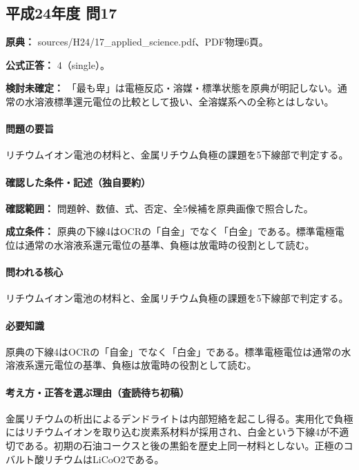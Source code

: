 \subsection{平成24年度 問17}
\label{q:h24-reg-applied-17}

\noindent\textbf{原典：} sources/H24/17\_applied\_science.pdf、PDF物理6頁。

\textbf{公式正答：} 4（single）。

\par\textbf{検討未確定：} 「最も卑」は電極反応・溶媒・標準状態を原典が明記しない。通常の水溶液標準還元電位の比較として扱い、全溶媒系への全称とはしない。

\paragraph{問題の要旨} リチウムイオン電池の材料と、金属リチウム負極の課題を5下線部で判定する。

\paragraph{確認した条件・記述（独自要約）}\mbox{}\par

\noindent\textbf{確認範囲：} 問題幹、数値、式、否定、全5候補を原典画像で照合した。\par

\noindent\textbf{成立条件：} 原典の下線4はOCRの「自金」でなく「白金」である。標準電極電位は通常の水溶液系還元電位の基準、負極は放電時の役割として読む。\par

\paragraph{問われる核心} リチウムイオン電池の材料と、金属リチウム負極の課題を5下線部で判定する。

\paragraph{必要知識} 原典の下線4はOCRの「自金」でなく「白金」である。標準電極電位は通常の水溶液系還元電位の基準、負極は放電時の役割として読む。

\paragraph{考え方・正答を選ぶ理由（査読待ち初稿）} 金属リチウムの析出によるデンドライトは内部短絡を起こし得る。実用化で負極にはリチウムイオンを取り込む炭素系材料が採用され、白金という下線4が不適切である。初期の石油コークスと後の黒鉛を歴史上同一材料としない。正極のコバルト酸リチウムはLiCoO2である。

